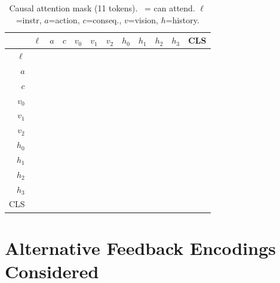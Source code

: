 \documentclass{article}
\newcommand{\cmark}{\ding{51}}
\newcommand{\xmark}{\ding{55}}
\begin{document}
\begin{table}[h]
\centering
\caption{Causal attention mask (11 tokens). \cmark\ = can attend.
         $\ell$=instr, $a$=action, $c$=conseq., $v$=vision, $h$=history.}
\label{tab:mask}
\scriptsize
\setlength{\tabcolsep}{3.5pt}
\begin{tabular}{r|ccccccccccc}
\toprule
 & $\ell$ & $a$ & $c$ & $v_0$ & $v_1$ & $v_2$ & $h_0$ & $h_1$ & $h_2$ & $h_3$ & CLS \\
\midrule
$\ell$   & \cmark & \xmark & \xmark & \xmark & \xmark & \xmark & \xmark & \xmark & \xmark & \xmark & \xmark \\
$a$      & \cmark & \cmark & \xmark & \xmark & \xmark & \xmark & \xmark & \xmark & \xmark & \xmark & \xmark \\
$c$      & \cmark & \cmark & \cmark & \xmark & \xmark & \xmark & \xmark & \xmark & \xmark & \xmark & \xmark \\
$v_0$    & \cmark & \cmark & \cmark & \cmark & \xmark & \xmark & \xmark & \xmark & \xmark & \xmark & \xmark \\
$v_1$    & \cmark & \cmark & \cmark & \cmark & \cmark & \xmark & \xmark & \xmark & \xmark & \xmark & \xmark \\
$v_2$    & \cmark & \cmark & \cmark & \cmark & \cmark & \cmark & \xmark & \xmark & \xmark & \xmark & \xmark \\
$h_0$    & \cmark & \cmark & \cmark & \cmark & \cmark & \cmark & \cmark & \xmark & \xmark & \xmark & \xmark \\
$h_1$    & \cmark & \cmark & \cmark & \cmark & \cmark & \cmark & \cmark & \cmark & \xmark & \xmark & \xmark \\
$h_2$    & \cmark & \cmark & \cmark & \cmark & \cmark & \cmark & \cmark & \cmark & \cmark & \xmark & \xmark \\
$h_3$    & \cmark & \cmark & \cmark & \cmark & \cmark & \cmark & \cmark & \cmark & \cmark & \cmark & \xmark \\
CLS      & \cmark & \cmark & \cmark & \cmark & \cmark & \cmark & \cmark & \cmark & \cmark & \cmark & \cmark \\
\bottomrule
\end{tabular}
\end{table}

\section{Alternative Feedback Encodings Considered}
\label{app:alternatives}
\end{document}
